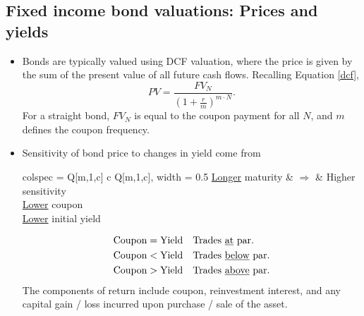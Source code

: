 \documentclass[../notes_compiled.tex]{subfiles}
\begin{document}
\subsection{Fixed income bond valuations: Prices and yields}
\begin{itemize}
\item Bonds are typically valued using DCF valuation, where the price is given by the sum of the present value of all future cash flows. Recalling Equation \ref{dcf},
\begin{equation*}
PV = \frac{FV_{N}}{\left( 1+\frac{r}{m}\right)^{m\cdot N}}.
\end{equation*}
For a straight bond, $FV_{N}$ is equal to the coupon payment for all $N$, and $m$ defines the coupon frequency.
\item Sensitivity of bond price to changes in yield come from
\begin{table}[H]
\centering
\begin{tblr}{colspec = {Q[m,1,c] c Q[m,1,c]}, width = 0.5\textwidth}
\underline{Longer} maturity &   $\Longrightarrow$ &  Higher sensitivity \\
\underline{Lower} coupon \\
\underline{Lower} initial yield
\end{tblr}
\end{table}
\vspace{-1cm}
\begin{align*}
\text{Coupon}&=\text{Yield} & &\text{Trades \underline{at} par}. \\
\text{Coupon}&<\text{Yield} & &\text{Trades \underline{below} par}.\\
\text{Coupon}&>\text{Yield} & &\text{Trades \underline{above} par}. \\
\end{align*}
The components of return include coupon, reinvestment interest, and any capital gain / loss incurred upon purchase / sale of the asset.
\end{itemize}
\end{document}
